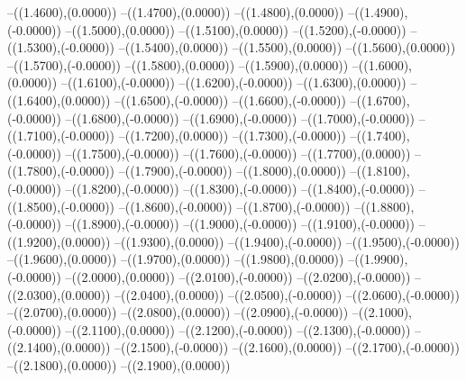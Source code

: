 {	--({\sx*(1.4600)},{\sy*(0.0000)})
	--({\sx*(1.4700)},{\sy*(0.0000)})
	--({\sx*(1.4800)},{\sy*(0.0000)})
	--({\sx*(1.4900)},{\sy*(-0.0000)})
	--({\sx*(1.5000)},{\sy*(0.0000)})
	--({\sx*(1.5100)},{\sy*(0.0000)})
	--({\sx*(1.5200)},{\sy*(-0.0000)})
	--({\sx*(1.5300)},{\sy*(-0.0000)})
	--({\sx*(1.5400)},{\sy*(0.0000)})
	--({\sx*(1.5500)},{\sy*(0.0000)})
	--({\sx*(1.5600)},{\sy*(0.0000)})
	--({\sx*(1.5700)},{\sy*(-0.0000)})
	--({\sx*(1.5800)},{\sy*(0.0000)})
	--({\sx*(1.5900)},{\sy*(0.0000)})
	--({\sx*(1.6000)},{\sy*(0.0000)})
	--({\sx*(1.6100)},{\sy*(-0.0000)})
	--({\sx*(1.6200)},{\sy*(-0.0000)})
	--({\sx*(1.6300)},{\sy*(0.0000)})
	--({\sx*(1.6400)},{\sy*(0.0000)})
	--({\sx*(1.6500)},{\sy*(-0.0000)})
	--({\sx*(1.6600)},{\sy*(-0.0000)})
	--({\sx*(1.6700)},{\sy*(-0.0000)})
	--({\sx*(1.6800)},{\sy*(-0.0000)})
	--({\sx*(1.6900)},{\sy*(-0.0000)})
	--({\sx*(1.7000)},{\sy*(-0.0000)})
	--({\sx*(1.7100)},{\sy*(-0.0000)})
	--({\sx*(1.7200)},{\sy*(0.0000)})
	--({\sx*(1.7300)},{\sy*(-0.0000)})
	--({\sx*(1.7400)},{\sy*(-0.0000)})
	--({\sx*(1.7500)},{\sy*(-0.0000)})
	--({\sx*(1.7600)},{\sy*(-0.0000)})
	--({\sx*(1.7700)},{\sy*(0.0000)})
	--({\sx*(1.7800)},{\sy*(-0.0000)})
	--({\sx*(1.7900)},{\sy*(-0.0000)})
	--({\sx*(1.8000)},{\sy*(0.0000)})
	--({\sx*(1.8100)},{\sy*(-0.0000)})
	--({\sx*(1.8200)},{\sy*(-0.0000)})
	--({\sx*(1.8300)},{\sy*(-0.0000)})
	--({\sx*(1.8400)},{\sy*(-0.0000)})
	--({\sx*(1.8500)},{\sy*(-0.0000)})
	--({\sx*(1.8600)},{\sy*(-0.0000)})
	--({\sx*(1.8700)},{\sy*(-0.0000)})
	--({\sx*(1.8800)},{\sy*(-0.0000)})
	--({\sx*(1.8900)},{\sy*(-0.0000)})
	--({\sx*(1.9000)},{\sy*(-0.0000)})
	--({\sx*(1.9100)},{\sy*(-0.0000)})
	--({\sx*(1.9200)},{\sy*(0.0000)})
	--({\sx*(1.9300)},{\sy*(0.0000)})
	--({\sx*(1.9400)},{\sy*(-0.0000)})
	--({\sx*(1.9500)},{\sy*(-0.0000)})
	--({\sx*(1.9600)},{\sy*(0.0000)})
	--({\sx*(1.9700)},{\sy*(0.0000)})
	--({\sx*(1.9800)},{\sy*(0.0000)})
	--({\sx*(1.9900)},{\sy*(-0.0000)})
	--({\sx*(2.0000)},{\sy*(0.0000)})
	--({\sx*(2.0100)},{\sy*(-0.0000)})
	--({\sx*(2.0200)},{\sy*(-0.0000)})
	--({\sx*(2.0300)},{\sy*(0.0000)})
	--({\sx*(2.0400)},{\sy*(0.0000)})
	--({\sx*(2.0500)},{\sy*(-0.0000)})
	--({\sx*(2.0600)},{\sy*(-0.0000)})
	--({\sx*(2.0700)},{\sy*(0.0000)})
	--({\sx*(2.0800)},{\sy*(0.0000)})
	--({\sx*(2.0900)},{\sy*(-0.0000)})
	--({\sx*(2.1000)},{\sy*(-0.0000)})
	--({\sx*(2.1100)},{\sy*(0.0000)})
	--({\sx*(2.1200)},{\sy*(-0.0000)})
	--({\sx*(2.1300)},{\sy*(-0.0000)})
	--({\sx*(2.1400)},{\sy*(0.0000)})
	--({\sx*(2.1500)},{\sy*(-0.0000)})
	--({\sx*(2.1600)},{\sy*(0.0000)})
	--({\sx*(2.1700)},{\sy*(-0.0000)})
	--({\sx*(2.1800)},{\sy*(0.0000)})
	--({\sx*(2.1900)},{\sy*(0.0000)})
}
